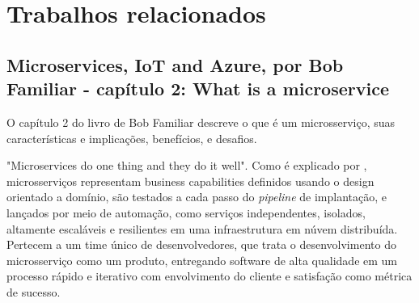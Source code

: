 
\section{Trabalhos relacionados}

\subsection{{Microservices, IoT and Azure, por Bob Familiar - capítulo 2: What is a microservice}}

O capítulo 2 do livro de Bob Familiar descreve o que é um microsserviço, suas características e implicações, benefícios, e desafios. 

"Microservices do one thing and they do it well". Como é explicado por  , microsserviços representam business capabilities definidos usando o design orientado a domínio, são testados a cada passo do \emph{pipeline} de implantação, e lançados por meio de automação, como serviços independentes, isolados, altamente escaláveis e resilientes em uma infraestrutura em núvem distribuída. Pertecem a um time único de desenvolvedores, que trata o desenvolvimento do microsserviço como um produto, entregando software de alta qualidade em um processo rápido e iterativo com envolvimento do cliente e satisfação como métrica de sucesso.

